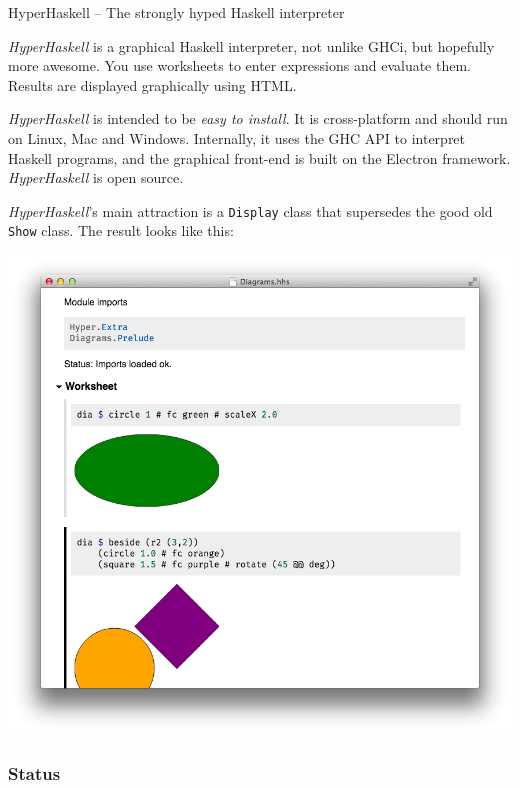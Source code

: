 \begin{hcarentry}[updated]{HyperHaskell -- The strongly hyped Haskell interpreter}
\label{hyper-haskell}
\makeheader

\emph{HyperHaskell} is a graphical Haskell interpreter, not unlike GHCi, but
hopefully more awesome. You use worksheets to enter expressions and evaluate
them. Results are displayed graphically using HTML.

\emph{HyperHaskell} is intended to be \emph{easy to install}. It is
cross-platform and should run on Linux, Mac and Windows. Internally, it uses
the GHC API to interpret Haskell programs, and the graphical front-end is
built on the Electron framework. \emph{HyperHaskell} is open source.

\emph{HyperHaskell}'s main attraction is a \verb`Display` class that
supersedes the good old \verb`Show` class. The result looks like this:

\begin{center}
  \includegraphics[width=\columnwidth]{html/worksheet-diagrams.png}
\end{center}

\subsubsection*{Status}


\end{hcarentry}
